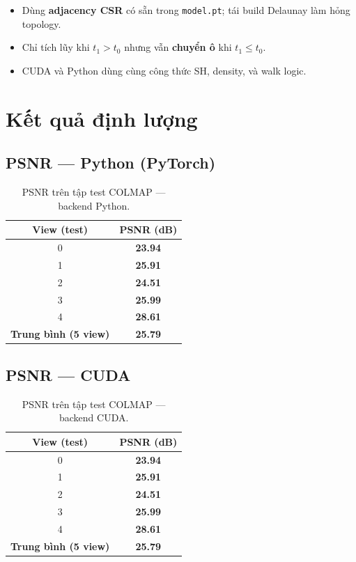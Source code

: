 \documentclass[11pt,a4paper]{article}
\begin{document}
\begin{itemize}[noitemsep]
    \item Dùng \textbf{adjacency CSR} có sẵn trong \texttt{model.pt}; tái build Delaunay làm hỏng topology.
    \item Chỉ tích lũy khi $t_1 > t_0$ nhưng vẫn \textbf{chuyển ô} khi $t_1 \leq t_0$.
    \item CUDA và Python dùng cùng công thức SH, density, và walk logic.
\end{itemize}

\section{Kết quả định lượng}

\subsection{PSNR --- Python (PyTorch)}

\begin{table}[H]
\centering
\caption{PSNR trên tập test COLMAP --- backend Python.}
\label{tab:psnr-python}
\begin{tabular}{cc}
\toprule
\textbf{View (test)} & \textbf{PSNR (dB)} \\
\midrule
0 & \textbf{23.94} \\
1 & \textbf{25.91} \\
2 & \textbf{24.51} \\
3 & \textbf{25.99} \\
4 & \textbf{28.61} \\
\midrule
\textbf{Trung bình (5 view)} & \textbf{25.79} \\
\bottomrule
\end{tabular}
\end{table}

\subsection{PSNR --- CUDA}

\begin{table}[H]
\centering
\caption{PSNR trên tập test COLMAP --- backend CUDA.}
\label{tab:psnr-cuda}
\begin{tabular}{cc}
\toprule
\textbf{View (test)} & \textbf{PSNR (dB)} \\
\midrule
0 & \textbf{23.94} \\
1 & \textbf{25.91} \\
2 & \textbf{24.51} \\
3 & \textbf{25.99} \\
4 & \textbf{28.61} \\
\midrule
\textbf{Trung bình (5 view)} & \textbf{25.79} \\
\bottomrule
\end{tabular}
\end{table}
\end{document}

